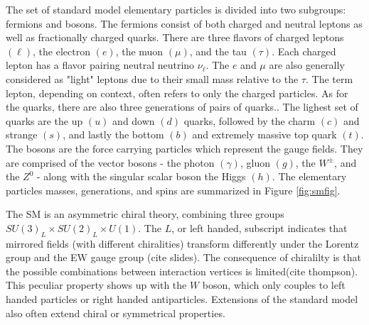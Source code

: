 The set of standard model elementary particles is divided into two subgroups: fermions and bosons.  The fermions consist of both charged and neutral leptons as well as fractionally charged quarks. There are three flavors of charged leptons $(\ell)$, the electron $(e)$, the muon $(\mu)$, and the tau $(\tau)$. Each charged lepton has a flavor pairing neutral neutrino $\nu_\ell$. The $e$ and $\mu$ are also generally considered as "light" leptons due to their small mass relative to the $\tau$. The term lepton, depending on context, often refers to only the charged particles. As for the quarks, there are also three generations of pairs of quarks.. The lighest set of quarks are the up $(u)$ and down $(d)$ quarks, followed by the charm $(c)$ and strange $(s)$, and lastly the bottom $(b)$ and extremely massive top quark $(t)$.  The bosons are the force carrying particles which represent the gauge fields. They are comprised of the vector bosons - the photon $(\gamma)$, gluon $(g)$, the $W^\pm$, and the $Z^0$ - along with the singular scalar boson the Higgs $(h)$. The elementary particles masses, generations, and spins are summarized in Figure \ref{fig:smfig}.






The SM is an asymmetric chiral theory, combining three groups $SU(3)_L \times SU(2)_L \times U(1)$. The $L$, or left handed, subscript indicates that mirrored fields (with different chiralities)  transform differently under the Lorentz group and the EW gauge group (cite slides).  The consequence of chiralilty is that the possible combinations between interaction vertices is limited(cite thompson). This peculiar property shows up with the $W$ boson, which only couples to left handed particles or right handed antiparticles. Extensions of the standard model also often extend chiral or symmetrical properties.  %

